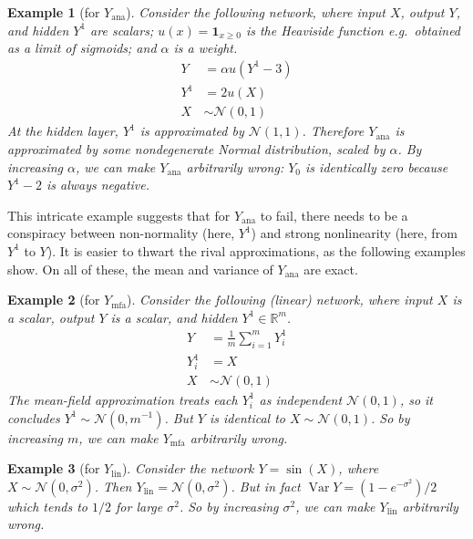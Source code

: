 \documentclass{article}
\newtheorem{example}{Example}
\DeclareMathOperator{\Var}{\operatorname{Var}}
\begin{document}
\begin{example}[for \(Y_\mathrm{ana}\)]
  Consider the following network, where input \(X\), output \(Y\), and hidden \(Y^1\) are scalars; \(u(x) = \bm{1}_{x \geq 0}\) is the Heaviside function e.g.~obtained as a limit of sigmoids; and \(\alpha\) is a weight.
  \begin{align*}
    Y &= \alpha u(Y^1 - 3)
    \\
    Y^1 &= 2 u(X)
    \\
    X &\sim \mathcal N(0, 1)
  \end{align*}
  At the hidden layer, \(Y^1 \) is approximated by \(\mathcal N(1, 1)\).
  Therefore \(Y_\mathrm{ana}\) is approximated by some nondegenerate Normal distribution, scaled by \(\alpha\).
  By increasing \(\alpha\), we can make \(Y_\mathrm{ana}\) arbitrarily wrong:
  \(Y_0\) is identically zero because \(Y^1 -2 \) is always negative.

  
\end{example}

This intricate example suggests that for \(Y_\mathrm{ana}\) to fail, there needs to be a conspiracy between non-normality (here, \(Y^1\)) and strong nonlinearity (here, from \(Y^1\) to \(Y\)).
It is easier to thwart the rival approximations, as the following examples show.
On all of these, the mean and variance of \(Y_\mathrm{ana}\) are exact.

\begin{example}[for \(Y_\mathrm{mfa}\)]
  \label{ex:mean-field}
  Consider the   following (linear) network, where input \(X\) is a scalar, output \(Y\) is a scalar, and hidden \(Y^1\in \mathbb{R}^m\).
  \begin{align*}
    Y &= \frac{1}{m} \sum_{i=1}^m Y^1_i
    \\
    Y^1_i &= X
    \\
    X &\sim \mathcal N(0, 1)
  \end{align*}
  The mean-field approximation treats each \(Y_i^1\) as independent \(\mathcal N(0, 1)\), so it concludes \(Y^1\sim \mathcal N(0, m^{-1})\).
  But \(Y\) is identical to \(X\sim \mathcal N(0, 1)\).
  So by increasing \(m\), we can make \(Y_\mathrm{mfa}\) arbitrarily wrong.
\end{example}

\begin{example}[for \(Y_\mathrm{lin}\)]
  Consider the network \(Y = \sin(X)\), where \(X \sim \mathcal N ({0, \sigma^2})\).
  Then \(Y_\mathrm{lin} = \mathcal{N}(0, \sigma^2)\).
  But in fact \(\Var Y = (1 - e^{-\sigma^2})/2\) which tends to \(1/2\) for large \(\sigma^2\).
  So by increasing \(\sigma^2\), we can make \(Y_\mathrm{lin}\) arbitrarily wrong.
\end{example}
\end{document}
